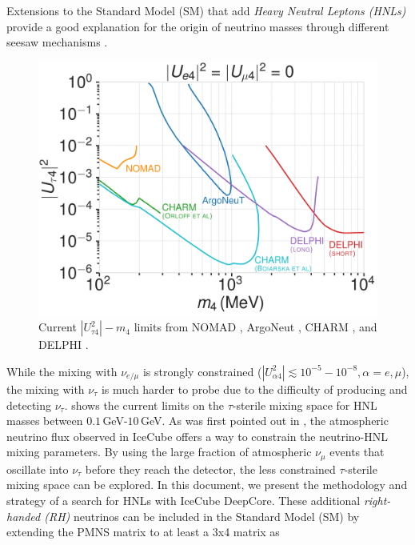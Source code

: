 Extensions to the Standard Model (SM) that add \textit{Heavy Neutral Leptons (HNLs)} provide a good explanation for the origin of neutrino masses through different seesaw mechanisms .
\begin{figure}
  \includegraphics{figures/hnl_simulation/theory/UtauN_custom_plots_LF_grid_white.png}
  \caption[Current $|U_{\tau4}^2|-m_4$ limits]{Current $|U_{\tau4}^2|-m_4$ limits from NOMAD \cite{NOMAD:2001eyx}, ArgoNeut \cite{ArgoNeuT:2021clc}, CHARM \cite{Orloff:2002de, Boiarska:2021yho}, and DELPHI \cite{DELPHI:1996qcc}.}
\end{figure}
While the mixing with $\nu_{e/\mu}$ is strongly constrained ($|U_{\alpha4}^2| \lesssim 10^{-5}-10^{-8}, \alpha=e,\mu$), the mixing with $\nu_{\tau}$ is much harder to probe due to the difficulty of producing and detecting $\nu_\tau$.  shows the current limits on the $\tau$-sterile mixing space for HNL masses between $0.1$\,GeV-$10$\,GeV. As was first pointed out in , the atmospheric neutrino flux observed in IceCube offers a way to constrain the neutrino-HNL mixing parameters. By using the large fraction of atmospheric $\nu_{\mu}$ events that oscillate into $\nu_{\tau}$ before they reach the detector, the less constrained $\tau$-sterile mixing space can be explored. In this document, we present the methodology and strategy of a search for HNLs with IceCube DeepCore. These additional \textit{right-handed (RH)} neutrinos can be included in the Standard Model (SM) by extending the PMNS matrix to at least a 3x4 matrix as
